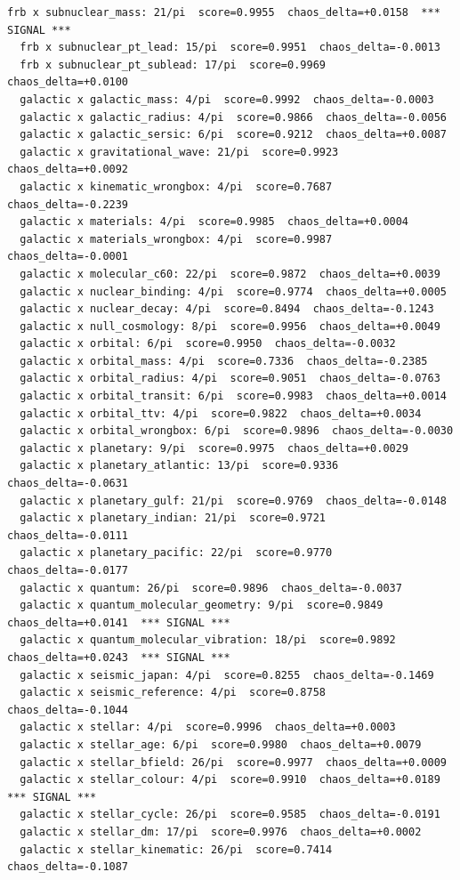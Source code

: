 \documentclass[11pt, letterpaper, openany]{book}
\begin{document}
\begin{empiricalbox}
\begin{lstlisting}[style=terminal]
  frb x subnuclear_mass: 21/pi  score=0.9955  chaos_delta=+0.0158  *** SIGNAL ***
  frb x subnuclear_pt_lead: 15/pi  score=0.9951  chaos_delta=-0.0013
  frb x subnuclear_pt_sublead: 17/pi  score=0.9969  chaos_delta=+0.0100
  galactic x galactic_mass: 4/pi  score=0.9992  chaos_delta=-0.0003
  galactic x galactic_radius: 4/pi  score=0.9866  chaos_delta=-0.0056
  galactic x galactic_sersic: 6/pi  score=0.9212  chaos_delta=+0.0087
  galactic x gravitational_wave: 21/pi  score=0.9923  chaos_delta=+0.0092
  galactic x kinematic_wrongbox: 4/pi  score=0.7687  chaos_delta=-0.2239
  galactic x materials: 4/pi  score=0.9985  chaos_delta=+0.0004
  galactic x materials_wrongbox: 4/pi  score=0.9987  chaos_delta=-0.0001
  galactic x molecular_c60: 22/pi  score=0.9872  chaos_delta=+0.0039
  galactic x nuclear_binding: 4/pi  score=0.9774  chaos_delta=+0.0005
  galactic x nuclear_decay: 4/pi  score=0.8494  chaos_delta=-0.1243
  galactic x null_cosmology: 8/pi  score=0.9956  chaos_delta=+0.0049
  galactic x orbital: 6/pi  score=0.9950  chaos_delta=-0.0032
  galactic x orbital_mass: 4/pi  score=0.7336  chaos_delta=-0.2385
  galactic x orbital_radius: 4/pi  score=0.9051  chaos_delta=-0.0763
  galactic x orbital_transit: 6/pi  score=0.9983  chaos_delta=+0.0014
  galactic x orbital_ttv: 4/pi  score=0.9822  chaos_delta=+0.0034
  galactic x orbital_wrongbox: 6/pi  score=0.9896  chaos_delta=-0.0030
  galactic x planetary: 9/pi  score=0.9975  chaos_delta=+0.0029
  galactic x planetary_atlantic: 13/pi  score=0.9336  chaos_delta=-0.0631
  galactic x planetary_gulf: 21/pi  score=0.9769  chaos_delta=-0.0148
  galactic x planetary_indian: 21/pi  score=0.9721  chaos_delta=-0.0111
  galactic x planetary_pacific: 22/pi  score=0.9770  chaos_delta=-0.0177
  galactic x quantum: 26/pi  score=0.9896  chaos_delta=-0.0037
  galactic x quantum_molecular_geometry: 9/pi  score=0.9849  chaos_delta=+0.0141  *** SIGNAL ***
  galactic x quantum_molecular_vibration: 18/pi  score=0.9892  chaos_delta=+0.0243  *** SIGNAL ***
  galactic x seismic_japan: 4/pi  score=0.8255  chaos_delta=-0.1469
  galactic x seismic_reference: 4/pi  score=0.8758  chaos_delta=-0.1044
  galactic x stellar: 4/pi  score=0.9996  chaos_delta=+0.0003
  galactic x stellar_age: 6/pi  score=0.9980  chaos_delta=+0.0079
  galactic x stellar_bfield: 26/pi  score=0.9977  chaos_delta=+0.0009
  galactic x stellar_colour: 4/pi  score=0.9910  chaos_delta=+0.0189  *** SIGNAL ***
  galactic x stellar_cycle: 26/pi  score=0.9585  chaos_delta=-0.0191
  galactic x stellar_dm: 17/pi  score=0.9976  chaos_delta=+0.0002
  galactic x stellar_kinematic: 26/pi  score=0.7414  chaos_delta=-0.1087

\end{lstlisting}
\end{empiricalbox}
\end{document}
